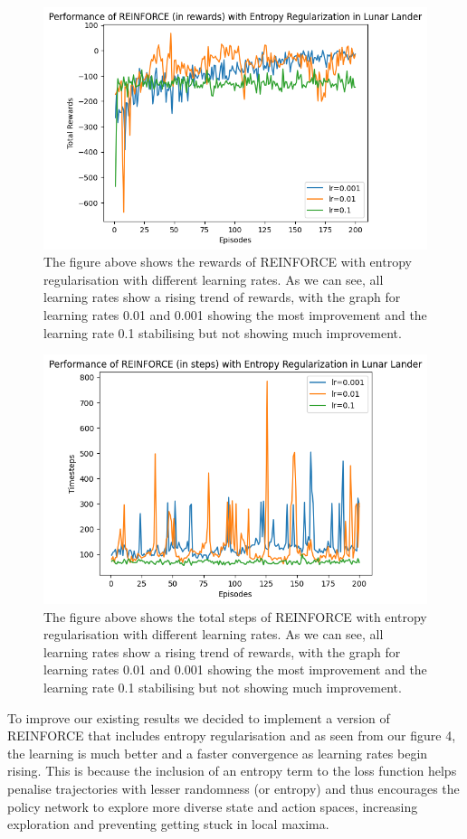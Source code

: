 \documentclass{article}
\begin{document}
\begin{figure}[!h]
\centering
\includegraphics[width=0.9\linewidth]{Report/images/04.Performance_of_REINFORCE_with_ER_Rewards.png}
\caption{\label{fig:ReinforceEntropy_Rewards_LR}The figure above shows the rewards of REINFORCE with entropy regularisation with different learning rates. As we can see, all learning rates show a rising trend of rewards, with the graph for learning rates 0.01 and 0.001 showing the most improvement and the learning rate 0.1 stabilising but not showing much improvement. }
\end{figure}


\begin{figure}[!h]
\centering
\includegraphics[width=0.9\linewidth]{Report/images/05.Performance_of_REINFORCE_with_ER_Steps.png}
\caption{\label{fig:ReinforceEntropy_Rewards_Steps}The figure above shows the total steps of REINFORCE with entropy regularisation with different learning rates. As we can see, all learning rates show a rising trend of rewards, with the graph for learning rates 0.01 and 0.001 showing the most improvement and the learning rate 0.1 stabilising but not showing much improvement. }
\end{figure}
\par To improve our existing results we decided to implement a version of REINFORCE that includes entropy regularisation and as seen from our figure 4, the learning is much better and a faster convergence as learning rates begin rising. This is because the inclusion of an entropy term to the loss function helps penalise trajectories with lesser randomness (or entropy) and thus encourages the policy network to explore more diverse state and action spaces, increasing exploration and preventing getting stuck in local maxima. 
  
\end{document}

